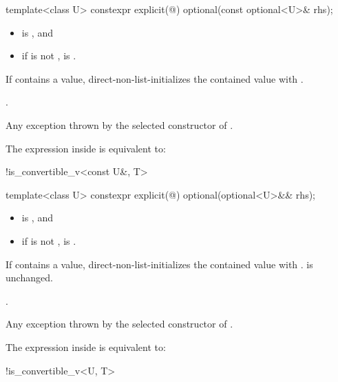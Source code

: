 %
\begin{itemdecl}
template<class U> constexpr explicit(@\seebelow@) optional(const optional<U>& rhs);
\end{itemdecl}

\begin{itemdescr}
\pnum
\constraints
\begin{itemize}
\item {} is , and
\item if  is not \cv{} ,
 is .
\end{itemize}

\pnum
\effects
If  contains a value,
direct-non-list-initializes the contained value with .

\pnum
\ensures
{}.

\pnum
\throws
Any exception thrown by the selected constructor of .

\pnum
\remarks
The expression inside  is equivalent to:
\begin{codeblock}
!is_convertible_v<const U&, T>
\end{codeblock}
\end{itemdescr}

%
\begin{itemdecl}
template<class U> constexpr explicit(@\seebelow@) optional(optional<U>&& rhs);
\end{itemdecl}

\begin{itemdescr}
\pnum
\constraints
\begin{itemize}
\item {} is , and
\item if  is not \cv{} ,
 is .
\end{itemize}

\pnum
\effects
If  contains a value,
direct-non-list-initializes the contained value with .
 is unchanged.

\pnum
\ensures
{}.

\pnum
\throws
Any exception thrown by the selected constructor of .

\pnum
\remarks
The expression inside  is equivalent to:
\begin{codeblock}
!is_convertible_v<U, T>
\end{codeblock}
\end{itemdescr}

